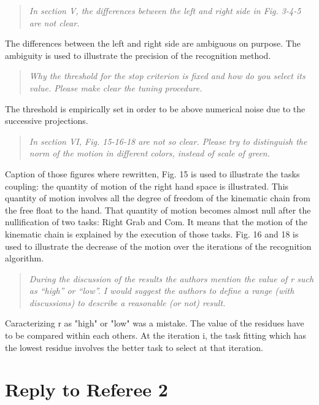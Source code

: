 \documentclass[11pt]{article}
\begin{document}
\begin{quote}
\textit{
 In section V, the differences between the left and right side in Fig. 3-4-5 are not clear.
}
\end{quote}
The differences between the left and right side are ambiguous on purpose.
The ambiguity is used to illustrate the precision of the recognition method.
 
\begin{quote}
\textit{
 Why the threshold for the stop criterion is fixed and how do you select its value.  Please make clear the tuning procedure.
}
\end{quote}
The threshold is empirically set in order to be above numerical noise
due to the successive projections.

\begin{quote}
\textit{
In section VI, Fig. 15-16-18 are not so clear. Please try to distinguish the norm of the motion in different colors, instead of scale of green.
}
\end{quote}
Caption of those figures where rewritten, Fig. 15 is used to illustrate
the tasks coupling: the quantity of motion of the right hand space is illustrated.
This quantity of motion involves all the degree of freedom of the kinematic chain from
the free float to the hand. That quantity of motion becomes almost null after
the nullification of two tasks: Right Grab and Com.
It means that the motion of the kinematic chain is explained by the execution of those tasks.
Fig. 16 and 18 is used to illustrate the decrease of the motion over the iterations of the recognition
algorithm.

\begin{quote}
\textit{
 During the discussion of the results the authors mention the value of r such as “high” or “low”. I would suggest the authors to define a range (with discussions) to describe a reasonable (or not) result.
}
\end{quote}
Caracterizing r as "high" or "low" was a mistake. The value of the residues have
to be compared within each others. At the iteration i, the task fitting which has the lowest 
residue involves the better task to select at that iteration.

\section{Reply to Referee 2}
\end{document}
